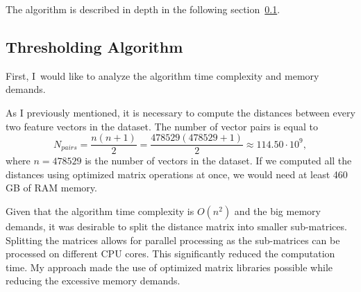 The algorithm is described in depth in the following section~\ref{subsec:thresholding-algorithm}.
\newpage
\subsection{Thresholding Algorithm}\label{subsec:thresholding-algorithm}
First, I would like to analyze the algorithm time complexity and memory demands.

As I previously mentioned, it is necessary to compute the distances between every two feature vectors in the dataset.
The number of vector pairs is equal to
\begin{equation}
    N_{pairs} = \frac{n\left(n+1\right)}{2} = \frac{478529\left(478529+1\right)}{2} \approx 114.50 \cdot 10^9,
\end{equation}
where $n = 478529$ is the number of vectors in the dataset.
If we computed all the distances using optimized matrix operations at once, we would need at least 460 GB of RAM memory.

Given that the algorithm time complexity is $O(n^2)$ and the big memory demands, it was desirable to split the distance
matrix into smaller sub-matrices.
Splitting the matrices allows for parallel processing as the sub-matrices can be processed on different CPU cores.
This significantly reduced the computation time.
My approach made the use of optimized matrix libraries possible while reducing the excessive memory demands.

